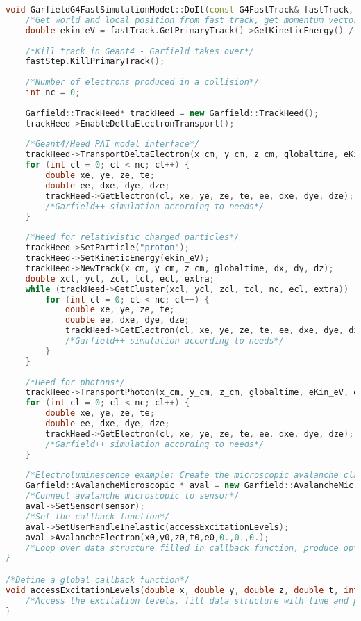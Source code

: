 \documentclass[preprint,12pt,sort&compress]{elsarticle}
\begin{document}
\begin{lstlisting}[label=code_DoIt_Garfield, caption=G4FastSimulationModel DoIt() method for Garfield++., language=C++]
void GarfieldG4FastSimulationModel::DoIt(const G4FastTrack& fastTrack, G4FastStep& fastStep) {
	/*Get world and local position from fast track, get momentum vector from fast track, get global time in ns, and x,y,z position in cm, get kinetic energy of fast track in eV*/
	double ekin_eV = fastTrack.GetPrimaryTrack()->GetKineticEnergy() / eV;
	
	/*Kill track in Geant4 - Garfield takes over*/
	fastStep.KillPrimaryTrack();
	
	/*Number of electrons produced in a collision*/
	int nc = 0;
	
	Garfield::TrackHeed* trackHeed = new Garfield::TrackHeed();
	trackHeed->EnableDeltaElectronTransport();
	
	/*Geant4/Heed PAI model interface*/
	trackHeed->TransportDeltaElectron(x_cm, y_cm, z_cm, globaltime, eKin_eV, dx, dy, dz, nc);	
	for (int cl = 0; cl < nc; cl++) {
		double xe, ye, ze, te;
		double ee, dxe, dye, dze;
		trackHeed->GetElectron(cl, xe, ye, ze, te, ee, dxe, dye, dze);	
		/*Garfield++ simulation according to needs*/	
	} 
	
	/*Heed for relativistic charged particles*/
	trackHeed->SetParticle("proton");
	trackHeed->SetKineticEnergy(ekin_eV);
	trackHeed->NewTrack(x_cm, y_cm, z_cm, globaltime, dx, dy, dz);
	double xcl, ycl, zcl, tcl, ecl, extra;
	while (trackHeed->GetCluster(xcl, ycl, zcl, tcl, nc, ecl, extra)) {
		for (int cl = 0; cl < nc; cl++) {
			double xe, ye, ze, te;
			double ee, dxe, dye, dze;
			trackHeed->GetElectron(cl, xe, ye, ze, te, ee, dxe, dye, dze);	
			/*Garfield++ simulation according to needs*/	
		}
	} 
		
	/*Heed for photons*/
	trackHeed->TransportPhoton(x_cm, y_cm, z_cm, globaltime, eKin_eV, dx, dy, dz,	nc);	
	for (int cl = 0; cl < nc; cl++) {
		double xe, ye, ze, te;
		double ee, dxe, dye, dze;
		trackHeed->GetElectron(cl, xe, ye, ze, te, ee, dxe, dye, dze);	
		/*Garfield++ simulation according to needs*/		
	} 	
	
	/*Electroluminescence example: Create the microscopic avalanche class*/
	Garfield::AvalancheMicroscopic * aval = new Garfield::AvalancheMicroscopic();
	/*Connect avalanche microscopic to sensor*/ 	
	aval->SetSensor(sensor);
	/*Set the callback function*/
	aval->SetUserHandleInelastic(accessExcitationLevels);
	aval->AvalancheElectron(x0,y0,z0,t0,e0,0.,0.,0.);
	/*Loop over data structure filled in callback function, produce optical photons in Geant4
}

/*Define a global callback function*/
void accessExcitationLevels(double x, double y, double z, double t, int type, int level,Garfield::Medium * m) {
	/*Access the excitation levels, fill data structure with time and position of excitations*/
}
\end{lstlisting}
\end{document}
